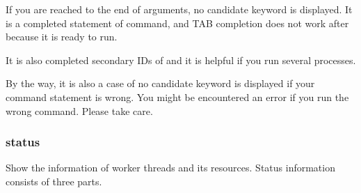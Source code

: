 \documentclass[a4paper,11pt,openany,oneside,english]{sphinxmanual}
\begin{document}
If you are reached to the end of arguments, no candidate keyword is displayed.
It is a completed statement of  command, and TAB
completion does not work after  because it is ready to run.

\begin{sphinxVerbatim}[commandchars=\\\{\},formatcom=\footnotesize]
\end{sphinxVerbatim}

It is also completed secondary IDs of  and it is helpful if you run
several  processes.

\begin{sphinxVerbatim}[commandchars=\\\{\},formatcom=\footnotesize]
\end{sphinxVerbatim}

By the way, it is also a case of no candidate keyword is displayed if your
command statement is wrong. You might be encountered an error if you run the
wrong command. Please take care.

\begin{sphinxVerbatim}[commandchars=\\\{\},formatcom=\footnotesize]
\end{sphinxVerbatim}


\subsubsection{status}
\label{\detokenize{commands/secondary/spp_mirror:status}}\label{\detokenize{commands/secondary/spp_mirror:commands-spp-mirror-status}}
Show the information of worker threads and its resources. Status information
consists of three parts.

\begin{sphinxVerbatim}[commandchars=\\\{\},formatcom=\footnotesize]
\end{sphinxVerbatim}
\end{document}

